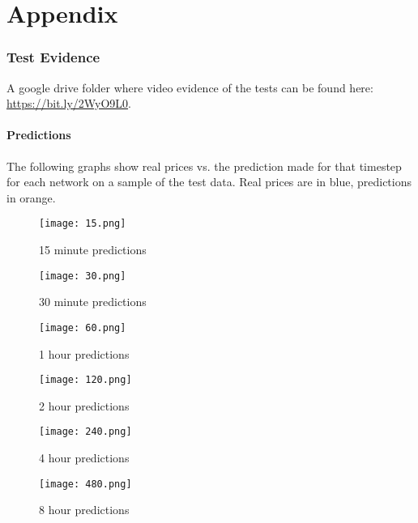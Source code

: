 \newpage
\part{Appendix}
\appendix

\section{Test Evidence}
    
    A google drive folder where video evidence of the tests can be found here: \url{https://bit.ly/2WyO9L0}.

    \subsection{Predictions}
    The following graphs show real prices vs. the prediction made for that timestep for each network on a sample of the test data. Real prices are in blue, predictions in orange.

    \begin{figure}[htbp]
        \centering
        \texttt{[image: 15.png]}
        \caption{15 minute predictions}
        \label{fig:15}
    \end{figure}

    \begin{figure}[htbp]
        \centering
        \texttt{[image: 30.png]}
        \caption{30 minute predictions}
        \label{fig:30}
    \end{figure}

    \begin{figure}[htbp]
        \centering
        \texttt{[image: 60.png]}
        \caption{1 hour predictions}
        \label{fig:60}
    \end{figure}

    \begin{figure}[htbp]
        \centering
        \texttt{[image: 120.png]}
        \caption{2 hour predictions}
        \label{fig:120}
    \end{figure}

    \begin{figure}[htbp]
        \centering
        \texttt{[image: 240.png]}
        \caption{4 hour predictions}
        \label{fig:240}
    \end{figure}

    \begin{figure}[htbp]
        \centering
        \texttt{[image: 480.png]}
        \caption{8 hour predictions}
        \label{fig:480}
    \end{figure}


